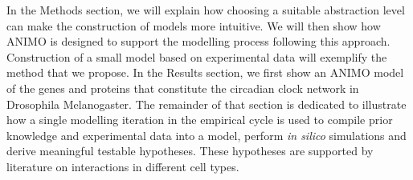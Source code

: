 In the Methods section, we will explain how choosing a suitable abstraction level can make the construction
of models more intuitive. We will then show how ANIMO is designed to support the modelling process following
this approach. Construction of a small model based on experimental data will exemplify the method that we
propose. In the Results section, we first show an ANIMO model of the genes and proteins that constitute
the circadian clock network in Drosophila Melanogaster. The remainder of that section is dedicated to
illustrate how a single modelling iteration in the empirical cycle is used to compile prior knowledge and
experimental data into a model, perform \emph{in silico} simulations and derive meaningful testable 
hypotheses. These hypotheses are supported by literature on interactions in different cell types.
